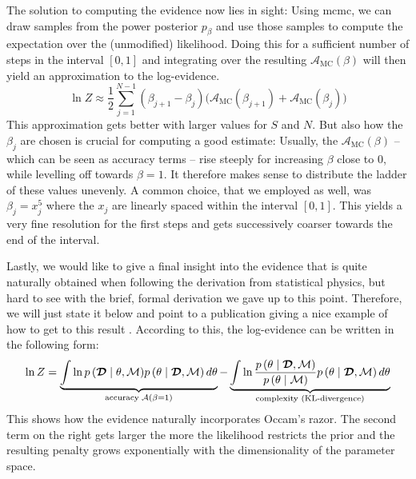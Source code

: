 \documentclass[\relativeRoot/main.tex]{subfiles}
\begin{document}
%
The solution to computing the evidence now lies in sight: Using \gls{mcmc}, we can draw samples from the power posterior $p_\beta$ and use those samples to compute the expectation over the (unmodified) likelihood. Doing this for a sufficient number of steps in the interval $\left[ 0, 1 \right]$ and integrating over the resulting $\mathcal{A}_\text{MC}(\beta)$ will then yield an approximation to the log-evidence.
%
\begin{equation}
    \ln{Z} \approx \frac{1}{2} \sum_{j=1}^{N-1} \left( \beta_{j+1} - \beta_j \right) \big( \mathcal{A}_\text{MC}(\beta_{j+1}) + \mathcal{A}_\text{MC}(\beta_j) \big)
\end{equation}
%
This approximation gets better with larger values for $S$ and $N$. But also how the $\beta_j$ are chosen is crucial for computing a good estimate: Usually, the $\mathcal{A}_\text{MC}(\beta)$ -- which can be seen as accuracy terms -- rise steeply for increasing $\beta$ close to 0, while levelling off towards $\beta=1$. It therefore makes sense to distribute the ladder of these values unevenly. A common choice, that we employed as well, was $\beta_j = x_j^5$ where the $x_j$ are linearly spaced within the interval $[0, 1]$. This yields a very fine resolution for the first steps and gets successively coarser towards the end of the interval.

Lastly, we would like to give a final insight into the evidence that is quite naturally obtained when following the derivation from statistical physics, but hard to see with the brief, formal derivation we gave up to this point. Therefore, we will just state it below and point to a publication giving a nice example of how to get to this result \cite{aponte_introduction_2022}. According to this, the log-evidence can be written in the following form:
%
\begin{equation} \label{eq:ti:acc_vs_kl}
    \ln{Z} = \underbrace{\int{ \ln{ p \left( \boldsymbol{\mathcal{D}} \mid \theta, \mathcal{M} \right) } p \left( \theta \mid \boldsymbol{\mathcal{D}}, \mathcal{M} \right) d\theta}}_{\text{accuracy} \; \mathcal{A}(\beta = 1)} - \underbrace{\int{ \ln{ \frac{p \left( \theta \mid \boldsymbol{\mathcal{D}}, \mathcal{M} \right)}{p \left( \theta \mid \mathcal{M} \right)} } p \left( \theta \mid \boldsymbol{\mathcal{D}}, \mathcal{M} \right) d\theta}}_\text{complexity (KL-divergence)}
\end{equation}
%
This shows how the evidence naturally incorporates Occam's razor. The second term on the right gets larger the more the likelihood restricts the prior and the resulting penalty grows exponentially with the dimensionality of the parameter space.
\end{document}
